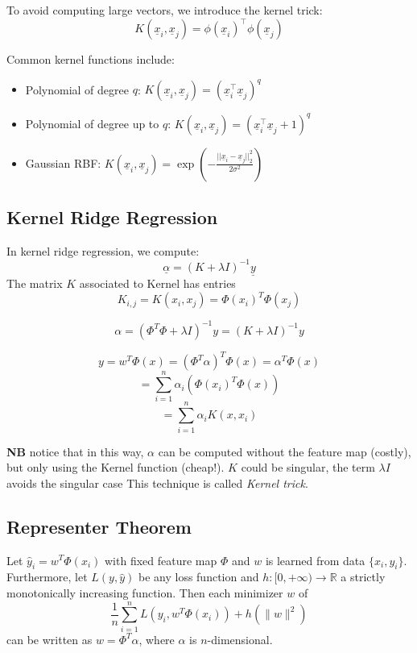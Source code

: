 To avoid computing large vectors, we introduce the kernel trick:
\[
    K(\underline{x}_i, \underline{x}_j) = \phi(\underline{x}_i)^\intercal \phi(\underline{x}_j)
\]

Common kernel functions include:
\begin{itemize}
    \item Polynomial of degree $q$: $K(\underline{x}_i, \underline{x}_j) = (\underline{x}_i^\intercal \underline{x}_j)^q$
    \item Polynomial of degree up to $q$: $K(\underline{x}_i, \underline{x}_j) = (\underline{x}_i^\intercal \underline{x}_j + 1)^q$
    \item Gaussian RBF: $K(\underline{x}_i, \underline{x}_j) = \exp(-\frac{||\underline{x}_i - \underline{x}_j||_2^2}{2\sigma^2})$
\end{itemize}

\subsection*{Kernel Ridge Regression}

In kernel ridge regression, we compute:
\[
    \underline{\alpha} = (K + \lambda I)^{-1} \underline{y}
\]
The matrix $K$ associated to Kernel has entries
\[ K_{i,j} = K(x_i, x_j) = \Phi(x_i)^T \Phi(x_j) \]

\[ \alpha = (\Phi^T \Phi + \lambda I)^{-1}  y = (K + \lambda I)^{-1} y \]

\[ y = w^T \Phi(x) = (\Phi^T \alpha)^T \Phi(x) = \alpha^T \Phi(x) \]
\[ = \sum_{i=1}^n \alpha_i (\Phi(x_i)^T \Phi(x)) \]
\[ = \sum_{i=1}^n \alpha_i K(x, x_i) \] %


\textbf{NB} notice that in this way, $\alpha$ can be computed without the feature map (costly), but only using the Kernel function (cheap!). 
$K$ could be singular, the term $\lambda I$ avoids the singular case
This technique is called \textit{Kernel trick}.


\subsection*{Representer Theorem}

Let $\hat{y}_i = w^T \Phi(x_i)$ with fixed feature map $\Phi$ and $w$ is learned from data $\{x_i, y_i\}$. Furthermore, let $L(y, \hat{y})$ be any loss function and $h: [0, +\infty) \rightarrow \mathbb{R}$ a strictly monotonically increasing function. Then each minimizer $w$ of
\[ \frac{1}{n} \sum_{i=1}^n L(y_i, w^T \Phi(x_i)) + h(\|w\|^2) \] %
can be written as $w = \Phi^T \alpha$, where $\alpha$ is $n$-dimensional.

